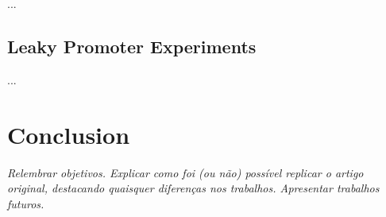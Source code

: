     ...


  \subsection{Leaky Promoter Experiments}

    ...


\section{Conclusion}


  \textit{Relembrar objetivos.
  Explicar como foi (ou não) possível replicar o artigo original, destacando quaisquer diferenças nos trabalhos.
  Apresentar trabalhos futuros.}
